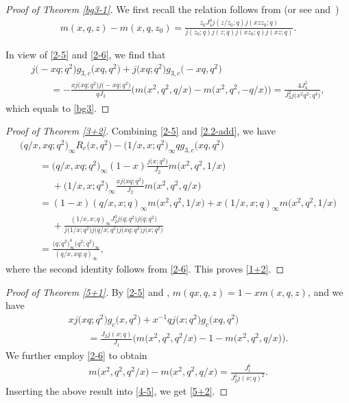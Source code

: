 \documentclass[10pt,a4paper]{amsart}
\numberwithin{equation}{section}
\begin{document}
\begin{proof} [Proof of Theorem \ref{bg3-1}]
We first recall the relation follows from \cite[equation~(3.7)]{HM} (or see \cite[Chapter~8]{BFOR} and~\cite{Z})
\begin{align}\label{2-6}
m(x,q,z)-m(x,q,z_0)=\frac{z_0J_1^3j(z/z_0;q)j(xzz_0;q)}
{j(z_0;q)j(z;q)j(xz_0;q)j(xz;q)}.
\end{align}

In view of \eqref{2-5} and \eqref{2-6}, we find that
\begin{gather*}
j\bigl(-xq;q^2\bigr)g_{3,c}\bigl(xq,q^2\bigr)+j\bigl(xq;q^2\bigr)g_{3,c}\bigl(-xq,q^2\bigr)\\
\qquad=-\frac{xj\bigl(xq;q^2\bigr)j\bigl(-xq;q^2\bigr)}{qJ_2}\bigl(m\bigl(x^2,q^2,q/x\bigr)-m\bigl(x^2,q^2,-q/x\bigr)\bigr)=\frac{4J_4^5}{J_2^2j\bigl(x^2q^2;q^4\bigr)},
\end{gather*}
which equals to \eqref{bg3}.
\end{proof}
\begin{proof}[Proof of Theorem \ref{3+2}]
Combining \eqref{2-5} and \eqref{2.2-add},
we have
\begin{gather*}
\bigl(q/x,xq;q^2\bigr)_{\infty}R_c\bigl(x,q^2\bigr)
-\bigl(1/x,x;q^2\bigr)_{\infty}qg_{3,c}\bigl(xq,q^2\bigr)\\
\qquad=\bigl(q/x,xq;q^2\bigr)_{\infty}(1-x)\frac{j\bigl(x;q^2\bigr)}{J_2}m\bigl(x^2,q^2,1/x\bigr)\\
\phantom{\qquad=}{}+\bigl(1/x,x;q^2\bigr)_{\infty}\frac{x j\bigl(xq;q^2\bigr)}{J_2}m\bigl(x^2,q^2,q/x\bigr)\\
\qquad=(1-x)(q/x,x;q)_{\infty}m\bigl(x^2,q^2,1/x\bigr)+x(1/x,x;q)_{\infty}m\bigl(x^2,q^2,1/x\bigr)\\
\phantom{\qquad=}{}+\frac{(1/x,x;q)_{\infty}J_2^3j\bigl(q;q^2\bigr)j\bigl(q;q^2\bigr)}
{j\bigl(1/x;q^2\bigr)j\bigl(q/x;q^2\bigr)j\bigl(xq;q^2\bigr)j\bigl(x;q^2\bigr)}\\
\qquad=\frac{\bigl(q;q^2\bigr)_{\infty}^4\bigl(q^2;q^2\bigr)_{\infty}}{(q/x,xq;q)_{\infty}},
\end{gather*}
where the second identity follows from \eqref{2-6}. This proves \eqref{1+2}.
\end{proof}
\begin{proof}[Proof of Theorem \ref{5+1}]
By \eqref{2-5} and \cite[(3.2c)]{HM},
$
m(qx,q,z)=1-xm(x,q,z)$,
and we have
\begin{gather}
xj\bigl(xq;q^2\bigr)g_c\bigl(x,q^2\bigr)+x^{-1}qj\bigl(x;q^2\bigr)g_c\bigl(xq,q^2\bigr)\nonumber\\
\qquad=\frac{J_2j(x;q)}{J_1}\bigl(m\bigl(x^2,q^2,q^2/x\bigr)-1-m\bigl(x^2,q^2,q/x\bigr)\bigr).\label{4-5}
\end{gather}
We further employ \eqref{2-6} to obtain
\begin{align*}
m\bigl(x^2,q^2,q^2/x\bigr)-m\bigl(x^2,q^2,q/x\bigr)=\frac{J_1^6}{J_2^3j(x;q)^2}.
\end{align*}
Inserting the above result into \eqref{4-5}, we get \eqref{5+2}.
\end{proof}
\end{document}
